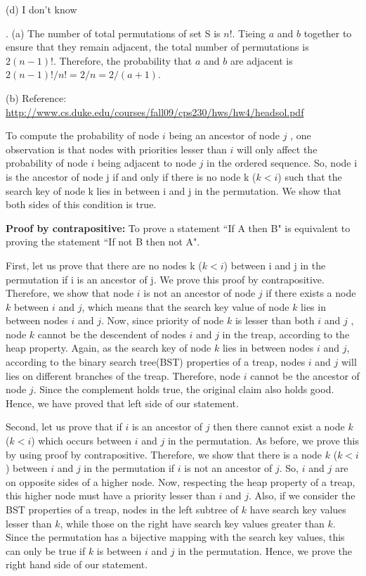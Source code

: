 \documentclass[assign]{article}
\begin{document}
\par (d) I don't know 

\clearpage

\par {}. (a) The number of total permutations of set S is $n!$. Tieing $a$ and $b$ together to ensure that they remain adjacent, the total number of permutations is $2(n-1)!$. Therefore, the probability that $a$ and $b$ are adjacent is $2(n-1)! / n! = 2/n = 2/(a+1)$.

\par (b) Reference: \url{ http://www.cs.duke.edu/courses/fall09/cps230/hws/hw4/headsol.pdf} 

To compute the probability of node $i$ being an ancestor of node $j$ , one observation is that nodes with priorities lesser than $i$ will only affect the probability of node $i$ being adjacent to node $j$ in the ordered sequence. So, node i is the ancestor of node j if and only if there is no node k ($k < i$) such that the search key of node k lies in between i and j in the permutation. We show that both sides of this condition is true. 

\par \textbf{Proof by contrapositive:} To prove a statement ``If A then B" is equivalent to proving the statement ``If not B then not A".

\par First, let us prove that there are no nodes k ($k< i$) between i and j in the permutation if i is an ancestor of j. We prove this proof by contrapositive. Therefore, we show that node $i$ is not an ancestor of node $j$ if there exists a node $k$ between $i$ and $j$, which means that the search key value of node $k$ lies in between nodes $i$ and $j$. Now, since priority of node $k$ is lesser than both $i$ and $j$ , node $k$ cannot be the descendent of nodes $i$ and $j$ in the treap, according to the heap property. Again, as the search key of node $k$ lies in between nodes $i$ and $j$, according to the binary search tree(BST) properties of a treap, nodes $i$ and $j$ will lies on different branches of the treap. Therefore, node $i$ cannot be the ancestor of node $j$.  Since the complement holds true, the original claim also holds good. Hence, we have proved that left side of our statement. 

\par Second, let us prove that if $i$ is an ancestor of $j$ then there cannot exist a node $k$ ($k < i$) which occurs between $i$ and $j$ in the permutation. As before, we prove this by using proof by contrapositive.  Therefore, we show that there is a node $k$ ($k < i$) between $i$ and $j$ in the permutation if $i$ is not an ancestor of $j$. So, $i$ and $j$ are on opposite sides of a higher node. Now, respecting the heap property of a treap, this higher node must have a priority lesser than $i$ and $j$. Also, if we consider the BST properties of a treap, nodes in the left subtree of $k$ have search key values lesser than $k$, while those on the right have search key values greater than $k$. Since the permutation has a bijective mapping with the search key values, this can only be true if $k$ is between $i$ and $j$ in the permutation.  Hence, we prove the right hand side of our statement. 
\end{document}
